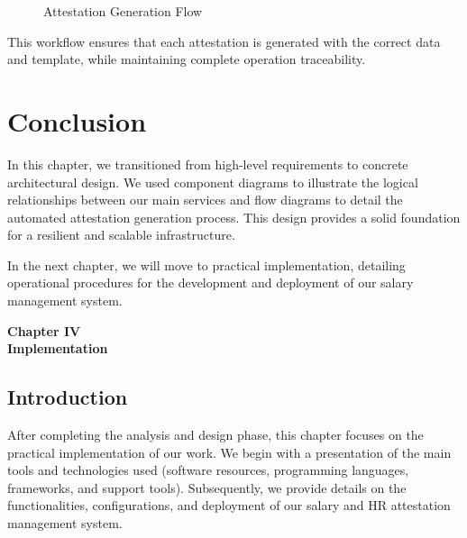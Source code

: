 \documentclass[a4paper,12pt]{report}
\begin{document}
\begin{doublespace}
\begin{figure}[H]
\caption{Attestation Generation Flow}
\label{fig:attestation-flow}
\end{figure}

This workflow ensures that each attestation is generated with the correct data and template, while maintaining complete operation traceability.

\section{Conclusion}
\hspace{1cm}In this chapter, we transitioned from high-level requirements to concrete architectural design. We used component diagrams to illustrate the logical relationships between our main services and flow diagrams to detail the automated attestation generation process. This design provides a solid foundation for a resilient and scalable infrastructure.

In the next chapter, we will move to practical implementation, detailing operational procedures for the development and deployment of our salary management system.
\end{doublespace}
\newpage

\cleardoublepage
\renewcommand{\headrulewidth}{1pt}
\fancyhead[R]{\hspace*{4cm}}

\setcounter{chapter}{4}
\begin{doublespace}
{}
\vspace*{10cm}
\centering
\textbf{ \huge Chapter IV \\ [1 cm] Implementation}
\end{doublespace}
\setcounter{section}{0}
\cleardoublepage

\fancyhead[R]{\nouppercase{\rightmark}}
\begin{doublespace}
 \section*{Introduction}
\hspace{1cm}After completing the analysis and design phase, this chapter focuses on the practical implementation of our work. 
 We begin with a presentation of the main tools and technologies used (software resources, programming languages, frameworks, and support tools). 
 Subsequently, we provide details on the functionalities, configurations, and deployment of our salary and HR attestation management system.
\end{doublespace}
\end{document}
